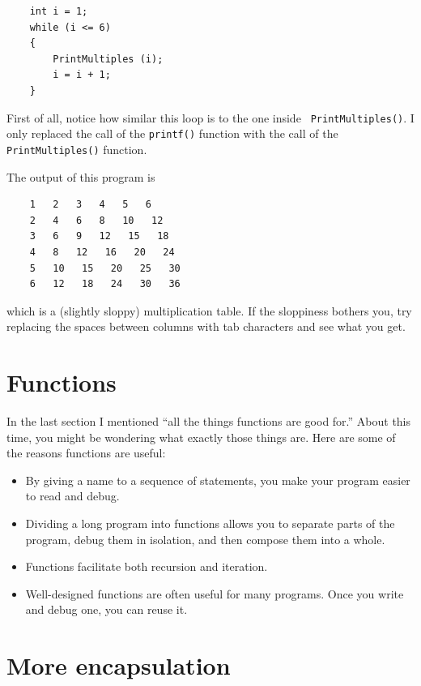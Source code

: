 \begin{verbatim}
    int i = 1;
    while (i <= 6) 
    {
        PrintMultiples (i);
        i = i + 1;
    }    
\end{verbatim}
%
First of all, notice how similar this loop is to the one inside {\tt
PrintMultiples()}.  I only replaced the call of the \texttt{printf()} function with 
the call of the \texttt{PrintMultiples()} function.

The output of this program is

\begin{verbatim}
    1   2   3   4   5   6   
    2   4   6   8   10   12   
    3   6   9   12   15   18   
    4   8   12   16   20   24   
    5   10   15   20   25   30   
    6   12   18   24   30   36   
\end{verbatim}
%
which is a (slightly sloppy) multiplication table.  If the
sloppiness bothers you, try replacing the spaces between
columns with tab characters and see what you get.

\section{Functions}

In the last section I mentioned ``all the things functions
are good for.''  About this time, you might be wondering
what exactly those things are.  Here are some of the reasons
functions are useful:

\begin{itemize}

\item By giving a name to a sequence of statements, you make
your program easier to read and debug.

\item Dividing a long program into functions allows you to
separate parts of the program, debug them in isolation, and
then compose them into a whole.

\item Functions facilitate both recursion and iteration.

\item Well-designed functions are often useful for many programs.
Once you write and debug one, you can reuse it.

\end{itemize}

\section{More encapsulation}

